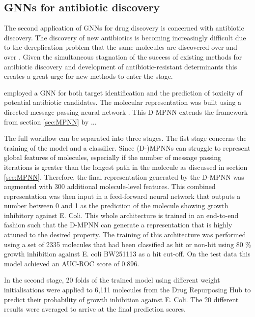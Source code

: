 \subsection{GNNs for antibiotic discovery}
The second application of GNNs for drug discovery is concerned with antibiotic discovery. The discovery of new antibiotics is becoming increasingly difficult due to the dereplication problem that the same molecules are discovered over and over \citep{COX201798}. Given the simultaneous stagnation of the success of existing methods for antibiotic discovery and development of antibiotic-resistant determinants this creates a great urge for new methods to enter the stage.  

\cite{STOKES2020688} employed a GNN for both target identification and the prediction of toxicity of potential antibiotic candidates. The molecular representation was built using a directed-message passing neural network \cite{yangMPP}. This D-MPNN extends the framework from section \ref{sec:MPNN} by ...

The full workflow can be separated into three stages. The fist stage concerns the training of the model and a classifier.
Since (D-)MPNNs can struggle to represent global features of molecules, especially if the number of message passing iterations is greater than the longest path in the molecule as discussed in section \ref{sec:MPNN}. Therefore, the final representation generated by the D-MPNN was augmented with 300 additional molecule-level features. This combined representation was then input in a feed-forward neural network that outputs a number between 0 and 1 as the prediction of the molecule showing growth inhibitory against E. Coli. This whole architecture is trained in an end-to-end fashion such that the D-MPNN can generate a representation that is highly attuned to the desired property.
The training of this architecture was performed using a set of 2335 molecules that had been classified as hit or non-hit using 80 \% growth inhibition against E. coli BW251113 \cite{ZAMPIERI20171214} as a hit cut-off. On the test data this model achieved an AUC-ROC score of 0.896.

In the second stage, 20 folds of the trained model using different weight initialisations were applied to 6,111 molecules from the Drug Repurposing Hub \citep{corsello} to predict their probability of growth inhibition against E. Coli. The 20 different results were averaged to arrive at the final prediction scores. 

